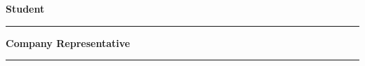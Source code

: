 \vspace{1cm}

\begin{center}
\begin{minipage}[t]{0.4\textwidth}
    \centering
    \textbf{Student}\\[0.2cm]

    \vspace{2.5cm}

    \rule{0.8\linewidth}{0.4pt}
\end{minipage}
\hfill
\begin{minipage}[t]{0.4\textwidth}
    \centering
    \textbf{Company Representative}\\[0.2cm]

    \vspace{2.5cm}

    \rule{0.8\linewidth}{0.4pt}
\end{minipage}
\end{center}